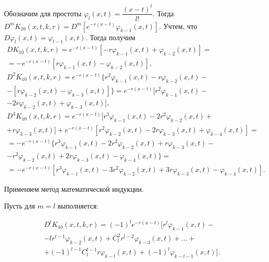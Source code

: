 Обозначим для простоты $ \varphi_l(x,t) = \dfrac{(x-t)^l}{l!} $.
Тогда $ D^mK_{10}(x,t,k,r) = D^m[e^{-r(x-t)}\varphi_{k-1}(x,t)]$.
Учтем, что $ D\varphi_l(x,t) = \varphi_{l-1}(x,t) $.
Тогда получим
\begin{equation}
\begin{array}{c}
\nonumber

DK_{10}(x,t,k,r) = e^{-r(x-t)}[-r\varphi_{k-1}(x,t) + \varphi_{k-2}(x,t)] = \\
= -e^{-r(x-t)}[r\varphi_{k-1}(x,t) - \varphi_{k-2}(x,t)], \\
D^2K_{10}(x,t,k,r) = e^{-r(x-t)}\lbrace r^2\varphi_{k-1}(x,t) - r\varphi_{k-2}(x,t) - \\ - [r\varphi_{k-2}(x,t) - \varphi_{k-3}(x,t)]\rbrace = e^{-r(x-t)}[r^2\varphi_{k-1}(x,t) - \\ -2r\varphi_{k-2}(x,t) + \varphi_{k-3}(x,t)], \\
D^3K_{10}(x,t,k,r) = e^{-r(x-t)}[r^3\varphi_{k-1}(x,t) -  2r^2\varphi_{k-2}(x,t) + \\ + r\varphi_{k-3}(x,t)] + e^{-r(x-t)}[r^2\varphi_{k-2}(x,t) - 2r\varphi_{k-3}(x,t) + \varphi_{k-4}(x,t)] = \\
= -e^{-r(x-t)}\lbrace r^3\varphi_{k-1}(x,t) - 2r^2\varphi_{k-2}(x,t) + r\varphi_{k-3}(x,t) - \\ - r^2\varphi_{k-2}(x,t) + 2r\varphi_{k-3}(x,t) - \varphi_{k-4}(x,t)\rbrace = \\ = -e^{-r(x-t)}[r^3\varphi_{k-1}(x,t) -3r^2\varphi_{k-2}(x,t) + 3r\varphi_{k-3}(x,t) - \varphi_{k-4}(x,t)].

\end{array}
\end{equation}

Применяем метод математической индукции.

Пусть для $ m = l $ выполняется:

\begin{equation}
\begin{array}{c}

D^lK_{10}(x,t,k,r) = (-1)^le^{-r(x-t)}[r^l\varphi_{k-1}(x,t) - \\ - lr^{l-1}\varphi_{k-2}(x,t) + C_l^2r^{l-2}\varphi_{k-3}(x,t) + ... + \\ + (-1)^{l-1}C_l^{l-1}r\varphi_{k-l}(x,t) + (-1)^l\varphi_{k-l-1}(x,t)].

\end{array}
\end{equation}

